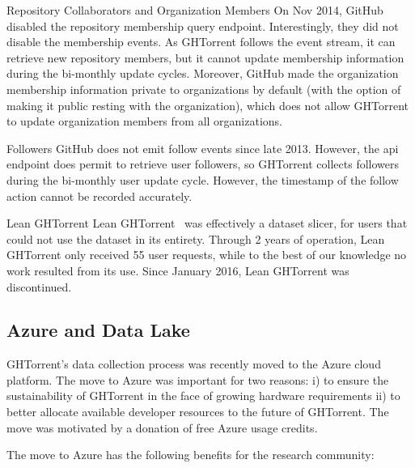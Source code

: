 \documentclass{sig-alternate}
\begin{document}
\begin{compactdesc}

  \item[Repository Collaborators and Organization Members] On Nov 2014, GitHub
    disabled the repository membership query endpoint. Interestingly, they did
    not disable the membership events. As GHTorrent follows the event stream, it
    can retrieve new repository members, but it cannot update membership
    information during the bi-monthly update cycles. Moreover, GitHub made the
    organization membership information private to organizations by default
    (with the option of making it public resting with the organization), which
    does not allow GHTorrent to update organization members from all
    organizations.

  \item[Followers] GitHub does not emit follow events since late 2013. However,
    the {\sc api} endpoint does permit to retrieve user followers, so GHTorrent
    collects followers during the bi-monthly user update cycle. However, the
    timestamp of the follow action cannot be recorded accurately.

  \item[Lean GHTorrent] Lean GHTorrent~\cite{GVSZ14} was effectively a dataset
    slicer, for users that could not use the dataset in its entirety. Through 2
    years of operation, Lean GHTorrent only received 55 user requests, while to
    the best of our knowledge no work resulted from its use. Since January 2016,
    Lean GHTorrent was discontinued.

\end{compactdesc}

\subsection{Azure and Data Lake}

GHTorrent's data collection process was recently moved to the Azure cloud
platform. The move to Azure was important for two reasons: i) to ensure the
sustainability of GHTorrent in the face of growing hardware requirements ii) to
better allocate available developer resources to the future of GHTorrent. The
move was motivated by a donation of free Azure usage credits.

The move to Azure has the following benefits for the research community:
\end{document}
